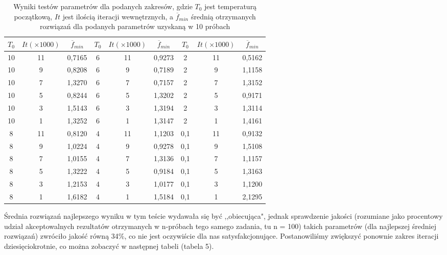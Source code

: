 \documentclass[twoside]{projektInzynierskiMS1}
\newcommand{\si}{ś}
\begin{document}
\clearpage
\begin{table}[htbp]\centering
\def\sym#1{\ifmmode^{#1}\else\(^{#1}\)\fi}
\caption{Wyniki testów parametrów dla podanych zakresów, gdzie $T_0$ jest temperaturą początkową, $It$ jest ilo\si cią iteracji wewnętrznych, a $\overline{f}_{min}$ \si rednią otrzymanych rozwiązań dla podanych parametrów uzyskaną w 10 próbach}
\begin{tabular}{|c|c|c||c|c|c||c|c|c|} 
                  \hline
                   $T_0$
                  & $It (\times 1000)$
                  &$\overline{f}_{min}$ 
& $T_0$
 & $It(\times 1000)$ 
 &$\overline{f}_{min}$ 
& $T_0$
& $It (\times 1000)$
&$\overline{f}_{min}$ \\ \hline
10 & 11 & 0,7165&6 & 11 & 0,9273 &2 & 11 & 0,5162 \\ \hline 
10 & 9 & 0,8208 &6 & 9 & 0,7189&2 & 9 & 1,1158 \\ \hline 
10 & 7 & 1,3270 &6 & 7 & 0,7157 &2 & 7 & 1,3152 \\ \hline 
10 & 5 & 0,8244 &6 & 5 & 1,3202 &2 & 5 & 0,9171 \\ \hline 
10 & 3 & 1,5143 &6 & 3 & 1,3194 &2 & 3 & 1,3114 \\ \hline 
10 & 1 & 1,3252 &6 & 1 & 1,3147 &2 & 1 & 1,4161 \\ \Xhline{3\arrayrulewidth}

8 & 11 & 0,8120 &4 & 11 & 1,1203 & 0,1 & 11 & 0,9132 \\ \hline 
8 & 9 & 1,0224 &4 & 9 & 0,9278& 0,1 & 9 & 1,5108 \\ \hline 
8 & 7 & 1,0155 &4 & 7 & 1,3136 & 0,1 & 7 & 1,1157 \\ \hline 
8 & 5 & 1,3222 &4 & 5 & 0,9184 & 0,1 & 5 & 1,3163 \\ \hline 
8 & 3 & 1,2153 &4 & 3 & 1,0177 & 0,1 & 3 & 1,1200 \\ \hline  
8 & 1 & 1,6182 &4 & 1 & 1,5184 & 0,1 & 1 & 2,1295 \\ \hline 
\end{tabular} 
\end{table}



Średnia rozwiązań najlepszego wyniku w tym te\si cie wydawała się być ,,obiecująca", jednak sprawdzenie jako\si ci (rozumiane jako procentowy udział akceptowalnych rezultatów otrzymanych w n-próbach tego samego zadania, tu n = 100) takich parametrów (dla najlepszej \si redniej rozwiązań) zwróciło jako\si ć równą 34\%, co nie jest oczywi\si cie dla nas satysfakcjonujące. Postanowili\si my zwiększyć ponownie zakres iteracji dziesięciokrotnie, co można zobaczyć w następnej tabeli (tabela 5). \\
\end{document}
